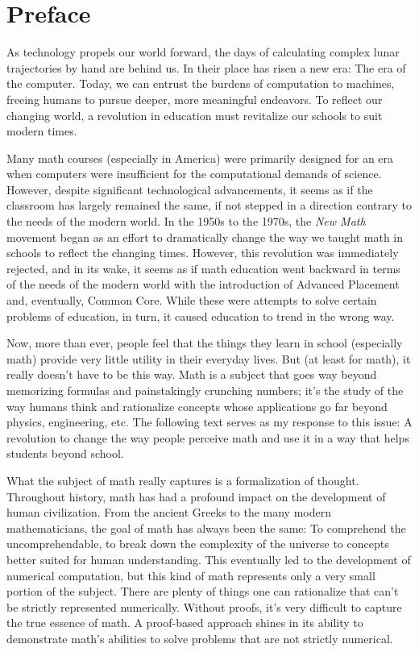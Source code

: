 \edef\mychapter{Preface}
\edef\mychapterdate{March 11, 2025}

\chapter*{\mychapter}
As technology propels our world forward, the days of calculating complex lunar trajectories by hand are behind us.
In their place has risen a new era: The era of the computer.
Today, we can entrust the burdens of computation to machines, freeing humans to pursue deeper, more meaningful endeavors.
To reflect our changing world, a revolution in education must revitalize our schools to suit modern times.

Many math courses (especially in America) were primarily designed for an era when computers were insufficient for the computational demands of science.
However, despite significant technological advancements, it seems as if the classroom has largely remained the same, if not stepped in a direction contrary to the needs of the modern world.
In the 1950s to the 1970s, the \textit{New Math} movement began as an effort to dramatically change the way we taught math in schools to reflect the changing times.
However, this revolution was immediately rejected, and in its wake, it seems as if math education went backward in terms of the needs of the modern world with the introduction of Advanced Placement and, eventually, Common Core.
While these were attempts to solve certain problems of education, in turn, it caused education to trend in the wrong way.

Now, more than ever, people feel that the things they learn in school (especially math) provide very little utility in their everyday lives.
But (at least for math), it really doesn't have to be this way.
Math is a subject that goes way beyond memorizing formulas and painstakingly crunching numbers; it's the study of the way humans think and rationalize concepts whose applications go far beyond physics, engineering, etc.
The following text serves as my response to this issue:
A revolution to change the way people perceive math and use it in a way that helps students beyond school.

What the subject of math really captures is a formalization of thought.
Throughout history, math has had a profound impact on the development of human civilization.
From the ancient Greeks to the many modern mathematicians, the goal of math has always been the same: 
To comprehend the uncomprehendable, to break down the complexity of the universe to concepts better suited for human understanding.
This eventually led to the development of numerical computation, but this kind of math represents only a very small portion of the subject.
There are plenty of things one can rationalize that can't be strictly represented numerically.
Without proofs, it's very difficult to capture the true essence of math.
A proof-based approach shines in its ability to demonstrate math's abilities to solve problems that are not strictly numerical.

